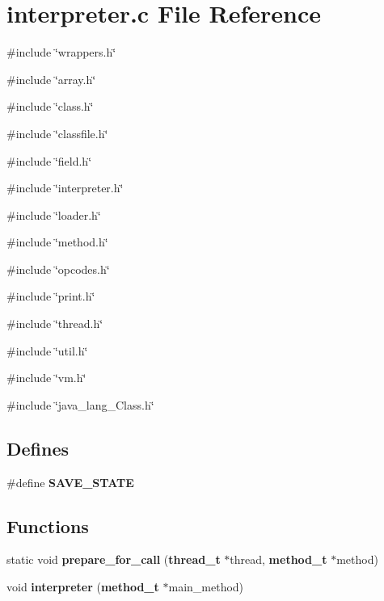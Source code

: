 \section{interpreter.c File Reference}
\label{interpreter_8c}
{\ttfamily \#include \char`\"{}wrappers.h\char`\"{}}\par
{\ttfamily \#include \char`\"{}array.h\char`\"{}}\par
{\ttfamily \#include \char`\"{}class.h\char`\"{}}\par
{\ttfamily \#include \char`\"{}classfile.h\char`\"{}}\par
{\ttfamily \#include \char`\"{}field.h\char`\"{}}\par
{\ttfamily \#include \char`\"{}interpreter.h\char`\"{}}\par
{\ttfamily \#include \char`\"{}loader.h\char`\"{}}\par
{\ttfamily \#include \char`\"{}method.h\char`\"{}}\par
{\ttfamily \#include \char`\"{}opcodes.h\char`\"{}}\par
{\ttfamily \#include \char`\"{}print.h\char`\"{}}\par
{\ttfamily \#include \char`\"{}thread.h\char`\"{}}\par
{\ttfamily \#include \char`\"{}util.h\char`\"{}}\par
{\ttfamily \#include \char`\"{}vm.h\char`\"{}}\par
{\ttfamily \#include \char`\"{}java\_\-lang\_\-Class.h\char`\"{}}\par
\subsection*{Defines}
\begin{DoxyCompactItemize}
\item 
\#define {\bf SAVE\_\-STATE}
\end{DoxyCompactItemize}
\subsection*{Functions}
\begin{DoxyCompactItemize}
\item 
static void {\bf prepare\_\-for\_\-call} ({\bf thread\_\-t} $\ast$thread, {\bf method\_\-t} $\ast$method)
\item 
void {\bf interpreter} ({\bf method\_\-t} $\ast$main\_\-method)
\end{DoxyCompactItemize}


